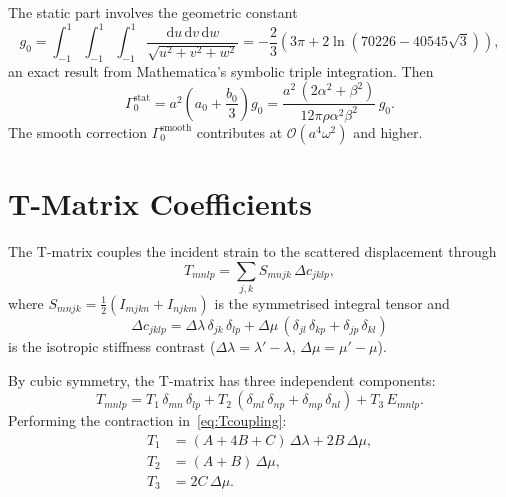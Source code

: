 \documentclass[11pt,a4paper]{article}
\newcommand{\dd}{\mathrm{d}}
\newcommand{\order}[1]{\mathcal{O}\!\left(#1\right)}
\newcommand{\Dlam}{\Delta\lambda}
\newcommand{\Dmu}{\Delta\mu}
\begin{document}
The static part involves the geometric constant
\begin{equation}
  g_0 = \int_{-1}^{1}\!\!\int_{-1}^{1}\!\!\int_{-1}^{1}
    \frac{\dd u\,\dd v\,\dd w}{\sqrt{u^2 + v^2 + w^2}}
  = -\frac{2}{3}\!\left(3\pi
    + 2\ln\!\left(70226 - 40545\sqrt{3}\right)\right),
  \label{eq:g0}
\end{equation}
an exact result from Mathematica's symbolic triple integration.
Then
\begin{equation}
  \Gamma_0^\text{stat}
  = a^2\!\left(a_0 + \frac{b_0}{3}\right) g_0
  = \frac{a^2\,(2\alpha^2 + \beta^2)}{12\pi\rho\alpha^2\beta^2}
    \,g_0.
  \label{eq:G0stat}
\end{equation}
The smooth correction $\Gamma_0^\text{smooth}$ contributes at
$\order{a^4\omega^2}$ and higher.

\section{T-Matrix Coefficients}
\label{sec:tmatrix}

The T-matrix couples the incident strain to the scattered
displacement through
\begin{equation}
  T_{mnlp} = \sum_{j,k}
    S_{mnjk}\,\Delta c_{jklp},
  \label{eq:Tcoupling}
\end{equation}
where $S_{mnjk} = \tfrac{1}{2}(I_{mjkn} + I_{njkm})$ is the
symmetrised integral tensor and
\begin{equation}
  \Delta c_{jklp} = \Dlam\,\delta_{jk}\,\delta_{lp}
    + \Dmu\,(\delta_{jl}\,\delta_{kp} + \delta_{jp}\,\delta_{kl})
  \label{eq:Dc}
\end{equation}
is the isotropic stiffness contrast
($\Dlam = \lambda' - \lambda$, $\Dmu = \mu' - \mu$).

By cubic symmetry, the T-matrix has three independent components:
\begin{equation}
  T_{mnlp} = T_1\,\delta_{mn}\,\delta_{lp}
    + T_2\,(\delta_{ml}\,\delta_{np} + \delta_{mp}\,\delta_{nl})
    + T_3\,E_{mnlp}.
  \label{eq:Tdecomp}
\end{equation}
Performing the contraction in~\eqref{eq:Tcoupling}:
\begin{equation}
  \boxed{
  \begin{aligned}
    T_1 &= (A + 4B + C)\,\Dlam + 2B\,\Dmu, \\[4pt]
    T_2 &= (A + B)\,\Dmu, \\[4pt]
    T_3 &= 2C\,\Dmu.
  \end{aligned}
  }
  \label{eq:T123}
\end{equation}
\end{document}
